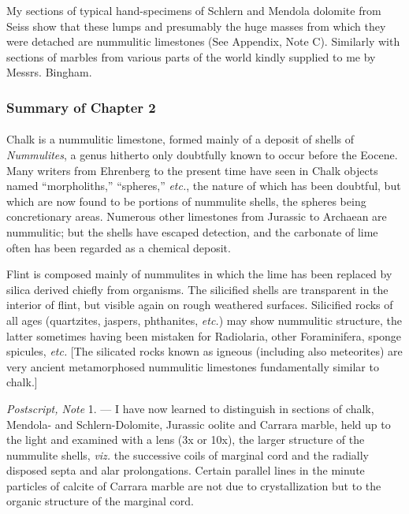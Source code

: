 \documentclass[a4paper, 12pt, oneside, landscape]{article}
\begin{document}
My sections of typical hand-specimens of Schlern and Mendola dolomite from Seiss show that these lumps and presumably the huge masses from which they were detached are nummulitic limestones (See Appendix, Note C). Similarly with sections of marbles from various parts of the world kindly supplied to me by Messrs. Bingham.

\subsubsection{Summary of Chapter 2}
\paragraph{}
Chalk is a nummulitic limestone, formed mainly of a deposit of shells of \emph{Nummulites}, a genus hitherto only doubtfully known to occur before the Eocene. Many writers from Ehrenberg to the present time have seen in Chalk objects named ``morpholiths,'' ``spheres,'' \emph{etc.}, the nature of which has been doubtful, but which are now found to be portions of nummulite shells, the spheres being concretionary areas. Numerous other limestones from Jurassic to Archaean are nummulitic; but the shells have escaped detection, and the carbonate of lime often has been regarded as a chemical deposit.

Flint is composed mainly of nummulites in which the lime has been replaced by silica derived chiefly from organisms. The silicified shells are transparent in the interior of flint, but visible again on rough weathered surfaces. Silicified rocks of all ages (quartzites, jaspers, phthanites, \emph{etc.}) may show nummulitic structure, the latter sometimes having been mistaken for Radiolaria, other Foraminifera, sponge spicules, \emph{etc.} [The silicated rocks known as igneous (including also meteorites) are very ancient metamorphosed nummulitic limestones fundamentally similar to chalk.]

\emph{Postscript, Note} 1. --- I have now learned to distinguish in sections of chalk, Mendola- and Schlern-Dolomite, Jurassic oolite and Carrara marble, held up to the light and examined with a lens (3x or 10x), the larger structure of the nummulite shells, \emph{viz.} the successive coils of marginal cord and the radially disposed septa and alar prolongations. Certain parallel lines in the minute particles of calcite of Carrara marble are not due to crystallization but to the organic structure of the marginal cord.
\end{document}
